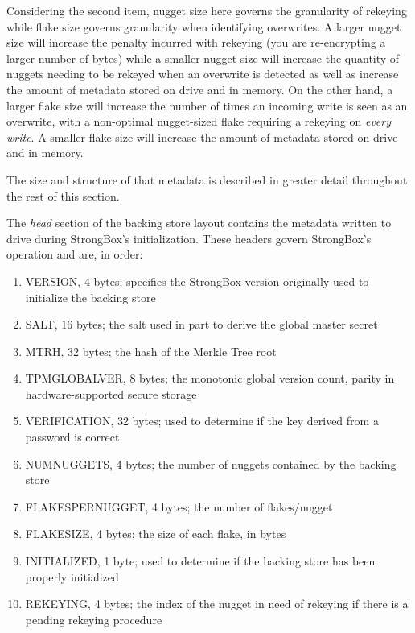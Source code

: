 Considering the second item, nugget size here governs the granularity of
rekeying while flake size governs granularity when identifying overwrites. A
larger nugget size will increase the penalty incurred with rekeying (you are
re-encrypting a larger number of bytes) while a smaller nugget size will increase
the quantity of nuggets needing to be rekeyed when an overwrite is detected as
well as increase the amount of metadata stored on drive and in memory. On the
other hand, a larger flake size will increase the number of times an incoming
write is seen as an overwrite, with a non-optimal nugget-sized flake requiring a
rekeying on \emph{every write}. A smaller flake size will increase the amount of
metadata stored on drive and in memory.

The size and structure of that metadata is described in greater detail
throughout the rest of this section.

The \textit{head} section of the backing store layout contains the metadata
written to drive during StrongBox's initialization. These headers govern
StrongBox's operation and are, in order:

\begin{enumerate}

\item VERSION, 4 bytes; specifies the StrongBox version originally used to
initialize the backing store

\item SALT, 16 bytes; the salt used in part to derive the global master secret

\item MTRH, 32 bytes; the hash of the Merkle Tree root

\item TPMGLOBALVER, 8 bytes; the monotonic global version count, parity in
hardware-supported secure storage

\item VERIFICATION, 32 bytes; used to determine if the key derived from a
password is correct

\item NUMNUGGETS, 4 bytes; the number of nuggets contained by the backing
store

\item FLAKESPERNUGGET, 4 bytes; the number of flakes/nugget

\item FLAKESIZE, 4 bytes; the size of each flake, in bytes

\item INITIALIZED, 1 byte; used to determine if the backing store has been
properly initialized

\item REKEYING, 4 bytes; the index of the nugget in need of rekeying if there
is a pending rekeying procedure

\end{enumerate}

